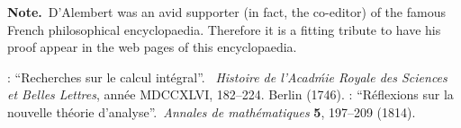 \documentclass[12pt]{article}
\begin{document}
\textbf{Note.}\, D'Alembert was an avid supporter (in fact, the co-editor) of the famous French philosophical encyclopaedia.  Therefore it is a fitting tribute to have his proof appear in the web pages of this encyclopaedia.

\begin{thebibliography}{8}
: ``Recherches sur le calcul int\'egral''.
\, \emph{Histoire de l'Acad\'mie Royale des Sciences et Belles Lettres}, ann\'ee MDCCXLVI, 182--224. Berlin (1746).
: ``R\'eflexions sur la nouvelle th\'eorie d'analyse''.\, \emph{Annales de math\'ematiques} \textbf{5}, 197--209 (1814).
\end{thebibliography}

\end{document}
